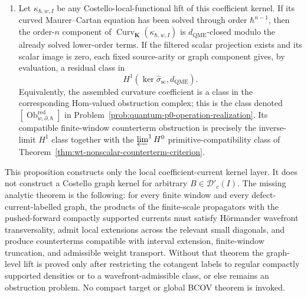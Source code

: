 \begin{prop}
\begin{enumerate}
\[      \{B^w_f(a),B^w_g(b)\}_{\hbar}
        =B^w_{\{f,g\}_{\hbar}}(ab),
    \]
    \[
      \{B^w_f(a),\Theta^w_\rho(B)\}_{\hbar}
        =
      \Theta^w_{\operatorname{ad}^{\vee}_{f,\hbar}\rho}(aB),
      \qquad
      \{\Theta^w_\rho(B),\Theta^w_\sigma(C)\}_{\hbar}=0.
    \]
    \item Let \(\kappa_{\hbar,w,I}\) be any Costello-local-functional lift
    of this coefficient kernel.  If its curved Maurer--Cartan equation has
    been solved through order \(\hbar^{n-1}\), then the order-\(n\)
    component of
    \(\operatorname{Curv}_{\mathbf K}(\kappa_{\hbar,w,I})\) is
    \(d_{\mathrm{QME}}\)-closed modulo the already solved lower-order
    terms.  If the filtered scalar projection exists and its scalar image
    is zero, each fixed source-arity or graph component gives, by
    evaluation, a residual class in
    \[
      H^1\!\left(\ker\widehat\sigma_{\mathrm{sc}},d_{\mathrm{QME}}\right).
    \]
    Equivalently, the assembled curvature coefficient is a class in the
    corresponding Hom-valued obstruction complex; this is the class denoted
    \([\operatorname{Ob}^{\mathrm{red}}_{w,\partial,\hbar}]\) in
    Problem~\ref{prob:quantum-p0-operation-realization}.
    Its compatible finite-window counterterm obstruction is precisely the
    inverse-limit \(H^1\) class together with the
    \(\varprojlim^1H^0\) primitive-compatibility class of
    Theorem~\ref{thm:wt-nonscalar-counterterm-criterion}.
  \end{enumerate}
  This proposition constructs only the local coefficient-current kernel
  layer.  It does not construct a Costello graph kernel for arbitrary
  \(B\in\mathcal D'_c(I)\).  The missing analytic theorem is the following:
  for every finite window and every defect-current-labelled graph, the
  products of the finite-scale propagators with the pushed-forward compactly
  supported currents must satisfy H\"ormander wavefront transversality, admit
  local extensions across the relevant small diagonals, and produce
  counterterms compatible with interval extension, finite-window
  truncation, and admissible weight transport.  Without that theorem the
  graph-level lift is proved only after restricting the cotangent labels to
  regular compactly supported densities or to a wavefront-admissible class,
  or else remains an obstruction problem.  No compact target or global
  BCOV theorem is invoked.
\end{prop}

